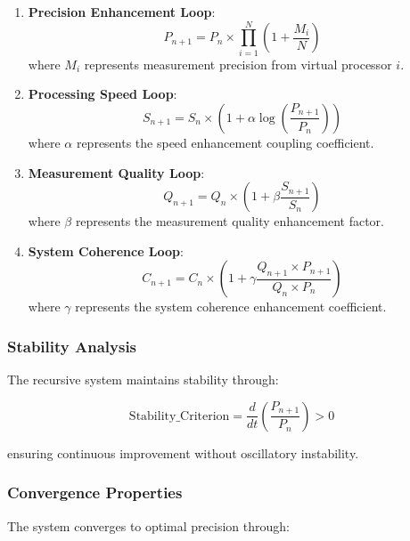 \documentclass[11pt]{article}
\theoremstyle{remark}
\begin{document}
\begin{enumerate}
\item \textbf{Precision Enhancement Loop}:
\begin{equation}
P_{n+1} = P_n \times \prod_{i=1}^{N} \left(1 + \frac{M_i}{N}\right)
\end{equation}
where $M_i$ represents measurement precision from virtual processor $i$.

\item \textbf{Processing Speed Loop}:
\begin{equation}
S_{n+1} = S_n \times \left(1 + \alpha \log\left(\frac{P_{n+1}}{P_n}\right)\right)
\end{equation}
where $\alpha$ represents the speed enhancement coupling coefficient.

\item \textbf{Measurement Quality Loop}:
\begin{equation}
Q_{n+1} = Q_n \times \left(1 + \beta \frac{S_{n+1}}{S_n}\right)
\end{equation}
where $\beta$ represents the measurement quality enhancement factor.

\item \textbf{System Coherence Loop}:
\begin{equation}
C_{n+1} = C_n \times \left(1 + \gamma \frac{Q_{n+1} \times P_{n+1}}{Q_n \times P_n}\right)
\end{equation}
where $\gamma$ represents the system coherence enhancement coefficient.
\end{enumerate}

\subsubsection{Stability Analysis}

The recursive system maintains stability through:

\begin{equation}
\text{Stability\_Criterion} = \frac{d}{dt}\left(\frac{P_{n+1}}{P_n}\right) > 0
\end{equation}

ensuring continuous improvement without oscillatory instability.

\subsubsection{Convergence Properties}

The system converges to optimal precision through:
\end{document}
